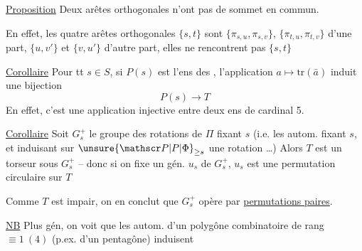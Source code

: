 \uline{Proposition}  Deux arêtes orthogonales n'ont pas de sommet en commun.

En effet, les quatre arêtes orthogonales  $\{s,t\}$ sont $\{\pi_{s,u},\pi_{s,v}\}$,  $\{\pi_{t,u},\pi_{t,v}\}$  d'une part, $\{u,v'\}$ et $\{v,u'\}$ d'autre part, elles ne rencontrent pas $\{s,t\}$

\uline{Corollaire} Pour tt $s\in S$, si $P(s)$ est l'ens des  , l'application $a\mapsto\mathrm{tr}(\bar a)$ induit une bijection
\[
P(s)\longrightarrow T
\]
En effet, c'est une application injective entre deux ens de cardinal 5.

\uline{Corollaire} Soit $G_s^+$ le groupe des rotations de $\Pi$ fixant $s$ (i.e. les autom. fixant $s$, et induisant sur $\unsure{\mathscr P|P|\Phi}_{\geq s}$ une rotation \ldots) Alors  $T$ est un torseur sous $G_s^+$ -- donc si on fixe un gén. $u_s$ de $G_s^+$, $u_s$ est une permutation circulaire sur $T$

Comme $T$ est  impair, on en conclut que $G_s^+$ opère par \uline{permutations paires}.

\uline{NB} Plus gén, on voit que les autom. d'un polygône combinatoire de rang  $\equiv 1\ (4)$ (p.ex. d'un pentagône) induisent
